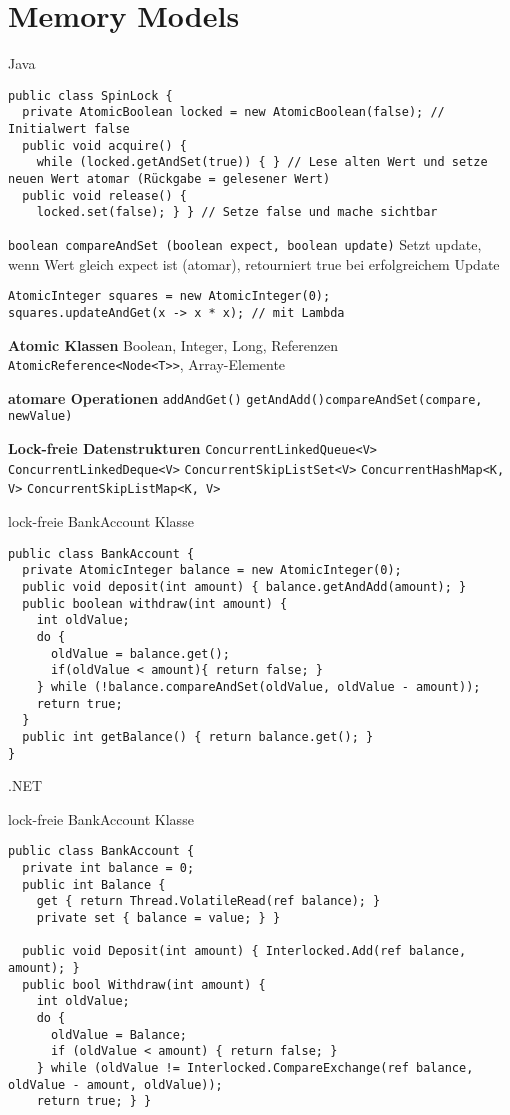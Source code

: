 \section{Memory Models}

Java

\begin{lstlisting}
public class SpinLock {
  private AtomicBoolean locked = new AtomicBoolean(false); // Initialwert false
  public void acquire() {
    while (locked.getAndSet(true)) { } // Lese alten Wert und setze neuen Wert atomar (Rückgabe = gelesener Wert)
  public void release() {
    locked.set(false); } } // Setze false und mache sichtbar
\end{lstlisting}

\lstinline{boolean compareAndSet (boolean expect, boolean update)} Setzt update, wenn Wert gleich expect ist (atomar), retourniert true bei erfolgreichem Update

\begin{lstlisting}
AtomicInteger squares = new AtomicInteger(0);
squares.updateAndGet(x -> x * x); // mit Lambda
\end{lstlisting}


\textbf{Atomic Klassen} Boolean, Integer, Long, Referenzen \lstinline{AtomicReference<Node<T>>}, Array-Elemente

\textbf{atomare Operationen} \lstinline{addAndGet()} \lstinline{getAndAdd()}\lstinline{compareAndSet(compare, newValue)}

\textbf{Lock-freie Datenstrukturen} \lstinline{ConcurrentLinkedQueue<V>} \lstinline{ConcurrentLinkedDeque<V>} \lstinline{ConcurrentSkipListSet<V>} \lstinline{ConcurrentHashMap<K, V>} \lstinline{ConcurrentSkipListMap<K, V>}

lock-freie BankAccount Klasse

\begin{lstlisting}
public class BankAccount {
  private AtomicInteger balance = new AtomicInteger(0);
  public void deposit(int amount) { balance.getAndAdd(amount); }
  public boolean withdraw(int amount) {
    int oldValue;
    do {
      oldValue = balance.get();
      if(oldValue < amount){ return false; }
    } while (!balance.compareAndSet(oldValue, oldValue - amount));
    return true;
  }
  public int getBalance() { return balance.get(); }
}
\end{lstlisting}

.NET

lock-freie BankAccount Klasse
\begin{lstlisting}
public class BankAccount {
  private int balance = 0;
  public int Balance {
    get { return Thread.VolatileRead(ref balance); }
    private set { balance = value; } }

  public void Deposit(int amount) { Interlocked.Add(ref balance, amount); }
  public bool Withdraw(int amount) {
    int oldValue;
    do {
      oldValue = Balance;
      if (oldValue < amount) { return false; }
    } while (oldValue != Interlocked.CompareExchange(ref balance, oldValue - amount, oldValue));
    return true; } }
\end{lstlisting}
